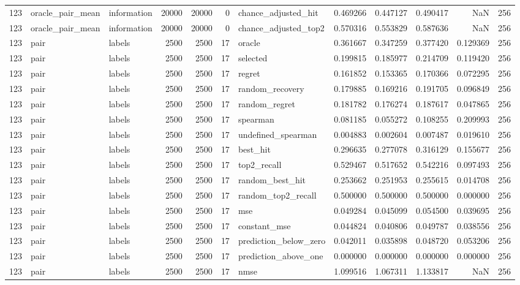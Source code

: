\begin{tabular}{rllrrrlrrrrr}
123 & oracle_pair_mean & information & 20000 & 20000 & 0 & chance_adjusted_hit & 0.469266 & 0.447127 & 0.490417 & NaN & 256 \\
123 & oracle_pair_mean & information & 20000 & 20000 & 0 & chance_adjusted_top2 & 0.570316 & 0.553829 & 0.587636 & NaN & 256 \\
123 & pair & labels & 2500 & 2500 & 17 & oracle & 0.361667 & 0.347259 & 0.377420 & 0.129369 & 256 \\
123 & pair & labels & 2500 & 2500 & 17 & selected & 0.199815 & 0.185977 & 0.214709 & 0.119420 & 256 \\
123 & pair & labels & 2500 & 2500 & 17 & regret & 0.161852 & 0.153365 & 0.170366 & 0.072295 & 256 \\
123 & pair & labels & 2500 & 2500 & 17 & random_recovery & 0.179885 & 0.169216 & 0.191705 & 0.096849 & 256 \\
123 & pair & labels & 2500 & 2500 & 17 & random_regret & 0.181782 & 0.176274 & 0.187617 & 0.047865 & 256 \\
123 & pair & labels & 2500 & 2500 & 17 & spearman & 0.081185 & 0.055272 & 0.108255 & 0.209993 & 256 \\
123 & pair & labels & 2500 & 2500 & 17 & undefined_spearman & 0.004883 & 0.002604 & 0.007487 & 0.019610 & 256 \\
123 & pair & labels & 2500 & 2500 & 17 & best_hit & 0.296635 & 0.277078 & 0.316129 & 0.155677 & 256 \\
123 & pair & labels & 2500 & 2500 & 17 & top2_recall & 0.529467 & 0.517652 & 0.542216 & 0.097493 & 256 \\
123 & pair & labels & 2500 & 2500 & 17 & random_best_hit & 0.253662 & 0.251953 & 0.255615 & 0.014708 & 256 \\
123 & pair & labels & 2500 & 2500 & 17 & random_top2_recall & 0.500000 & 0.500000 & 0.500000 & 0.000000 & 256 \\
123 & pair & labels & 2500 & 2500 & 17 & mse & 0.049284 & 0.045099 & 0.054500 & 0.039695 & 256 \\
123 & pair & labels & 2500 & 2500 & 17 & constant_mse & 0.044824 & 0.040806 & 0.049787 & 0.038556 & 256 \\
123 & pair & labels & 2500 & 2500 & 17 & prediction_below_zero & 0.042011 & 0.035898 & 0.048720 & 0.053206 & 256 \\
123 & pair & labels & 2500 & 2500 & 17 & prediction_above_one & 0.000000 & 0.000000 & 0.000000 & 0.000000 & 256 \\
123 & pair & labels & 2500 & 2500 & 17 & nmse & 1.099516 & 1.067311 & 1.133817 & NaN & 256 \\

\end{tabular}
